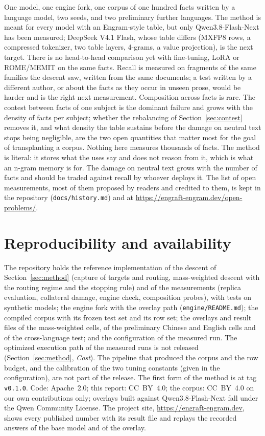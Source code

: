 \documentclass[10pt,a4paper]{article}
\begin{document}
One model, one engine fork, one corpus of one hundred facts written by a language model,
two seeds, and two preliminary further languages. The method is meant for every model with an
Engram-style table, but only Qwen3.8-Flash-Next has been measured; DeepSeek V4.1 Flash, whose
table differs (MXFP8 rows, a compressed tokenizer, two table layers, 4-grams, a value
projection), is the next target. There is no head-to-head comparison yet with fine-tuning,
LoRA or ROME/MEMIT on the same facts. Recall is measured on fragments of the same families the
descent saw, written from the same documents; a test written by a different author, or
about the facts as they occur in unseen prose, would be harder and is the right next
measurement. Composition across facts is rare. The contest between facts of one subject
is the dominant failure and grows with the density of facts per subject; whether the
rebalancing of Section~\ref{sec:contest} removes it, and what density the table sustains
before the damage on neutral text stops being negligible, are the two open quantities that
matter most for the goal of transplanting a corpus. Nothing here measures thousands of
facts. The method is literal: it stores what the uses say and does not reason from it,
which is what an n-gram memory is for. The damage on neutral text grows with the number of
facts and should be traded against recall by whoever deploys it. The list of open
measurements, most of them proposed by readers and credited to them, is kept in the
repository (\texttt{docs/history.md}) and at \url{https://engraft-engram.dev/open-problems/}.

\section*{Reproducibility and availability}

The repository holds the reference implementation of the descent of
Section~\ref{sec:method} (capture of targets and routing, mass-weighted descent with the
routing regime and the stopping rule) and of the measurements (replica evaluation,
collateral damage, engine check, composition probes), with tests on synthetic models; the
engine fork with the overlay path (\texttt{engine/README.md}); the compiled corpus with its
frozen test set and its row set; the overlays and result files of the mass-weighted cells,
of the preliminary Chinese and English cells and of the cross-language test; and the
configuration of the measured run. The optimized execution path of the measured runs is not
released (Section~\ref{sec:method}, \emph{Cost}). The pipeline that produced the corpus and
the row budget, and the calibration of the two tuning constants (given in the
configuration), are not part of the release. The first form of the method is at tag
\texttt{v0.1.0}. Code: Apache~2.0; this report: CC~BY~4.0; the corpus: CC~BY~4.0 on our own
contributions only; overlays built against Qwen3.8-Flash-Next fall under the Qwen Community
License. The project site, \url{https://engraft-engram.dev}, shows every published number
with its result file and replays the recorded answers of the base model and of the overlay.
\end{document}
